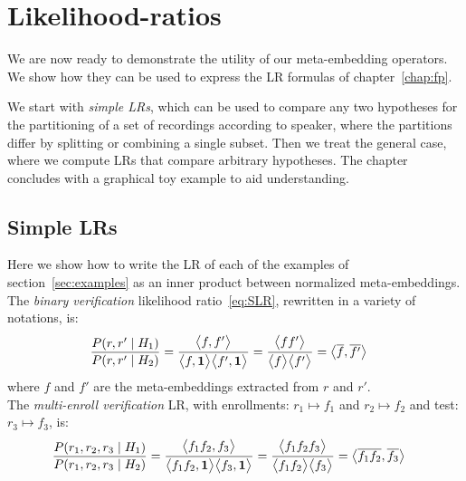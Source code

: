 \documentclass[a4paper,oneside,12pt,english]{report}
\def\expv#1#2{\bigl\langle#1\bigr\rangle_{#2}}
\def\dot#1#2{\expv{#1,#2}{}}
\def\normal#1{\overline{#1}}
\begin{document}
\chapter{Likelihood-ratios}
We are now ready to demonstrate the utility of our meta-embedding operators. We show how they can be used to express the LR formulas of chapter~\ref{chap:fp}. 

We start with \emph{simple LRs}, which can be used to compare any two hypotheses for the partitioning of a set of recordings according to speaker, where the partitions differ by splitting or combining a single subset. Then we treat the general case, where we compute LRs that compare arbitrary hypotheses. The chapter concludes with a graphical toy example to aid understanding.

 

\section{Simple LRs}
\label{sec:simpleLR}
Here we show how to write the LR of each of the examples of section~\ref{sec:examples} as an inner product between normalized meta-embeddings.\\

\noindent The \emph{binary verification} likelihood ratio~\eqref{eq:SLR}, rewritten in a variety of notations, is:
\begin{align}
\label{eq:slrdot}
\frac{P(r,r'\mid H_1)}{P(r,r'\mid H_2)} &= \frac{\dot{f}{f'}}{\dot{f}{\onevec}\dot{f'}{\onevec}}
= \frac{\expv{ff'}{}}{\expv{f}{}\expv{f'}{}}
= \dot{\normal{f}}{\normal{f'}}
\end{align}
where $f$ and $f'$ are the meta-embeddings extracted from $r$ and $r'$. \\

\noindent The \emph{multi-enroll verification} LR, with enrollments: $r_1\mapsto f_1$ and $r_2\mapsto f_2$ and test: $r_3\mapsto f_3$, is:
\begin{align}
\label{eq:mlrdot}
\frac{P(r_1,r_2,r_3\mid H_1)}{P(r_1,r_2,r_3\mid H_2)} &= \frac{\dot{f_1f_2}{f_3}}{\dot{f_1f_2}{\onevec}\dot{f_3}{\onevec}}
= \frac{\expv{f_1f_2f_3}{}}{\expv{f_1f_2}{}\expv{f_3}{}}
= \dot{\normal{f_1f_2}}{\normal{f_3}}
\end{align} \\
\end{document}
